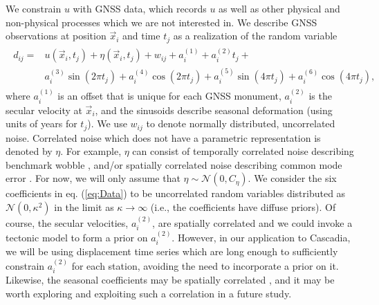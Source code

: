 \documentclass[10pt,letter]{article}
\begin{document}
We constrain $u$ with GNSS data, which records $u$ as well as other physical and non-physical processes which we are not interested in. We describe GNSS observations at position $\vec{x}_i$ and time $t_j$ as a realization of the random variable 
\begin{align}\label{eq:Data}
\begin{split}
d_{ij} = &u(\vec{x}_i,t_j) + \eta(\vec{x}_i,t_j) + w_{ij} + a^{(1)}_i + a^{(2)}_it_j + \\
         &a^{(3)}_i\sin(2 \pi t_j) + a^{(4)}_i\cos(2 \pi t_j) + a^{(5)}_i\sin(4 \pi t_j) + a^{(6)}_i\cos(4 \pi t_j), 
\end{split}
\end{align}
where $a^{(1)}_{i}$ is an offset that is unique for each GNSS monument, $a^{(2)}_{i}$ is the secular velocity at $\vec{x}_i$, and the sinusoids describe seasonal deformation (using units of years for $t_j$). We use $w_{ij}$ to denote normally distributed, uncorrelated noise. Correlated noise which does not have a parametric representation is denoted by $\eta$.  For example, $\eta$ can consist of temporally correlated noise describing benchmark wobble \citep[e.g.,][]{Wyatt1982,Wyatt1989}, and/or spatially correlated noise describing common mode error \citep[e.g.,][]{Wdowinski1997}. For now, we will only assume that $\eta \sim \mathcal{N}(0,C_\eta)$. We consider the six coefficients in eq. (\ref{eq:Data}) to be uncorrelated random variables distributed as $\mathcal{N}(0,\kappa^2)$ in the limit as $\kappa \to \infty$ (i.e., the coefficients have diffuse priors). Of course, the secular velocities, $a^{(2)}_{i}$, are spatially correlated and we could invoke a tectonic model to form a prior on $a^{(2)}_{i}$. However, in our application to Cascadia, we will be using displacement time series which are long enough to sufficiently constrain $a^{(2)}_{i}$ for each station, avoiding the need to incorporate a prior on it. Likewise, the seasonal coefficients may be spatially correlated \citep{Langbein2008}, and it may be worth exploring and exploiting such a correlation in a future study. 
\end{document}
